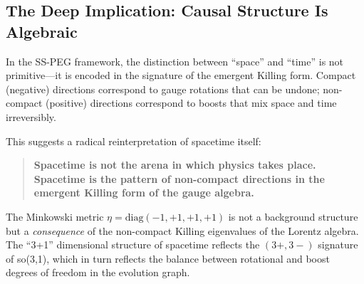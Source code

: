 \subsection{The Deep Implication: Causal Structure Is Algebraic}\label{sec:deep_implication}

In the SS-PEG framework, the distinction between ``space'' and ``time'' is not primitive---it is encoded in the signature of the emergent Killing form. Compact (negative) directions correspond to gauge rotations that can be undone; non-compact (positive) directions correspond to boosts that mix space and time irreversibly.

This suggests a radical reinterpretation of spacetime itself:

\begin{quote}
\textbf{Spacetime is not the arena in which physics takes place. Spacetime is the pattern of non-compact directions in the emergent Killing form of the gauge algebra.}
\end{quote}

The Minkowski metric $\eta = \mathrm{diag}(-1,+1,+1,+1)$ is not a background structure but a \textit{consequence} of the non-compact Killing eigenvalues of the Lorentz algebra. The ``3+1'' dimensional structure of spacetime reflects the $(3+,3-)$ signature of so(3,1), which in turn reflects the balance between rotational and boost degrees of freedom in the evolution graph.
